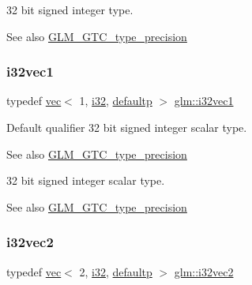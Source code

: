 32 bit signed integer type. \begin{DoxySeeAlso}{See also}
\hyperlink{group__gtc__type__precision}{G\+L\+M\+\_\+\+G\+T\+C\+\_\+type\+\_\+precision} 
\end{DoxySeeAlso}
\mbox{\label{group__gtc__type__precision_ga97351dd7f0ede9b8b79943f4adcd6a65}} 
\subsubsection{\texorpdfstring{i32vec1}{i32vec1}}
{\footnotesize\ttfamily typedef \hyperlink{structglm_1_1vec}{vec}$<$ 1, \hyperlink{group__gtc__type__precision_ga1d8ed5c43e91ea7d4528389da4fa9524}{i32}, \hyperlink{namespaceglm_a36ed105b07c7746804d7fdc7cc90ff25a9d21ccd8b5a009ec7eb7677befc3bf51}{defaultp} $>$ \hyperlink{group__gtc__type__precision_ga97351dd7f0ede9b8b79943f4adcd6a65}{glm\+::i32vec1}}

Default qualifier 32 bit signed integer scalar type. \begin{DoxySeeAlso}{See also}
\hyperlink{group__gtc__type__precision}{G\+L\+M\+\_\+\+G\+T\+C\+\_\+type\+\_\+precision}
\end{DoxySeeAlso}
32 bit signed integer scalar type. \begin{DoxySeeAlso}{See also}
\hyperlink{group__gtc__type__precision}{G\+L\+M\+\_\+\+G\+T\+C\+\_\+type\+\_\+precision} 
\end{DoxySeeAlso}
\mbox{\label{group__gtc__type__precision_ga99191e0de942ecc1df32d522f8064789}} 
\subsubsection{\texorpdfstring{i32vec2}{i32vec2}}
{\footnotesize\ttfamily typedef \hyperlink{structglm_1_1vec}{vec}$<$ 2, \hyperlink{group__gtc__type__precision_ga1d8ed5c43e91ea7d4528389da4fa9524}{i32}, \hyperlink{namespaceglm_a36ed105b07c7746804d7fdc7cc90ff25a9d21ccd8b5a009ec7eb7677befc3bf51}{defaultp} $>$ \hyperlink{group__gtc__type__precision_ga99191e0de942ecc1df32d522f8064789}{glm\+::i32vec2}}

